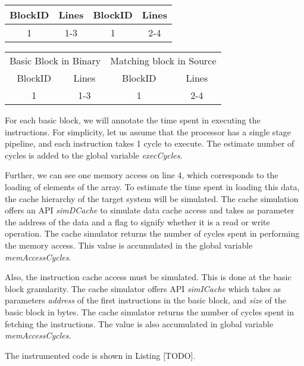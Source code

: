 \begin{table}
\begin{longtable}[c]{cccc}
\toprule 
	BlockID & Lines & BlockID & Lines \\
    \midrule
	1 & 1-3 & 1 & 2-4 \\
    \bottomrule
\end{longtable}
\end{table}

\begin{table}
\begin{longtable}[c]{cccc}
\toprule 
	\multicolumn{2}{c}{Basic Block in Binary} & \multicolumn{2}{c}{Matching block in Source}\\ 
	\multicolumn{1}{c}{BlockID} &
	\multicolumn{1}{c}{Lines} &
	\multicolumn{1}{c}{BlockID} &
	\multicolumn{1}{c}{Lines} \\
    \midrule
	1 & 1-3 & 1 & 2-4 \\
    \bottomrule
\end{longtable}
\end{table}

For each basic block, we will annotate the time spent in executing the instructions. For simplicity, let us assume that the processor has a single stage pipeline, and each instruction takes 1 cycle to execute. The estimate number of cycles is added to the global variable \textit{execCycles}.

Further, we can see one memory access on line 4, which corresponds to the loading of elements of the array. To estimate the time spent in loading this data, the cache hierarchy of the target system will be simulated. The cache simulation offers an API \textit{simDCache} to simulate data cache access and takes as parameter the address of the data and a flag to signify whether it is a read or write operation. The cache simulator returns the number of cycles spent in performing the memory access. This value is accumulated in the global variable \textit{memAccessCycles}. 

Also, the instruction cache access must be simulated. This is done at the basic block granularity. The cache simulator offers API \textit{simICache} which takes as parameters \textit{address} of the first instructions in the basic block, and \textit{size} of the basic block in bytes. The cache simulator returns the number of cycles spent in fetching the instructions. The value is also accumulated in global variable \textit{memAccessCycles}.

The instrumented code is shown in Listing [TODO].

